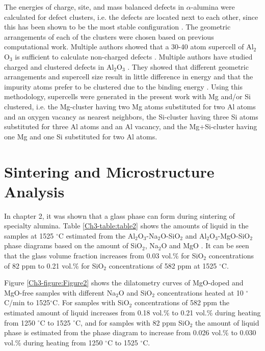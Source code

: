 The energies of charge, site, and mass balanced defects in $\alpha$-alumina were calculated for defect clusters, i.e. the defects are located next to each other, since this has been shown to be the most stable configuration \cite{Atkinson2003}. The geometric arrangements of each of the clusters were chosen based on previous computational work. Multiple authors showed that a 30-40 atom supercell of Al$_{2}$O$_{3}$ is sufficient to calculate non-charged defects \cite{Atkinson2003,Grimes1994,Lagerlof1998,Xiang2015,Sarsam2013}. Multiple authors have studied charged and clustered defects in Al$_{2}$O$_{3}$ \cite{Atkinson2003,Grimes1994,Lagerlof1998,Xiang2015,Sarsam2013}. They showed that different geometric arrangements and supercell size result in little difference in energy and that the impurity atoms prefer to be clustered due to the binding energy \cite{Atkinson2003,Grimes1994,Lagerlof1998,Xiang2015,Sarsam2013}. Using this methodology, supercells were generated in the present work with Mg and/or Si clustered, i.e. the Mg-cluster having two Mg atoms substituted for two Al atoms and an oxygen vacancy as nearest neighbors, the Si-cluster having three Si atoms substituted for three Al atoms and an Al vacancy, and the Mg+Si-cluster having one Mg and one Si substituted for two Al atoms. 

\section{Sintering and Microstructure Analysis}

In chapter 2, it was shown that a glass phase can form during sintering of specialty alumina. Table \ref{Ch3-table:table2} shows the amounts of liquid in the samples at 1525 $^{\circ}$C estimated from the Al$_{2}$O$_{3}$-Na$_{2}$O-SiO$_{2}$ and Al$_{2}$O$_{3}$-MgO-SiO$_{2}$ phase diagrams based on the amount of SiO$_{2}$, Na$_{2}$O and MgO \cite{Mao2005}. It can be seen that the glass volume fraction increases from 0.03 vol.\% for SiO$_{2}$ concentrations of 82 ppm to 0.21 vol.\% for SiO$_{2}$ concentrations of 582 ppm at 1525 $^{\circ}$C. 

Figure \ref{Ch3-figure:Figure2} shows the dilatometry curves of MgO-doped and MgO-free \cite{Frueh2016} samples with different Na$_{2}$O and SiO$_{2}$ concentrations heated at 10 $^{\circ}$C/min to 1525$^{\circ}$C. For samples with SiO$_{2}$ concentrations of 582 ppm the estimated amount of liquid increases from 0.18 vol.\% to 0.21 vol.\% during heating from 1250 $^{\circ}$C to 1525 $^{\circ}$C, and for samples with 82 ppm SiO$_{2}$ the amount of liquid phase is estimated from the phase diagram to increase from 0.026 vol.\% to 0.030 vol.\% during heating from 1250 $^{\circ}$C to 1525 $^{\circ}$C. 

